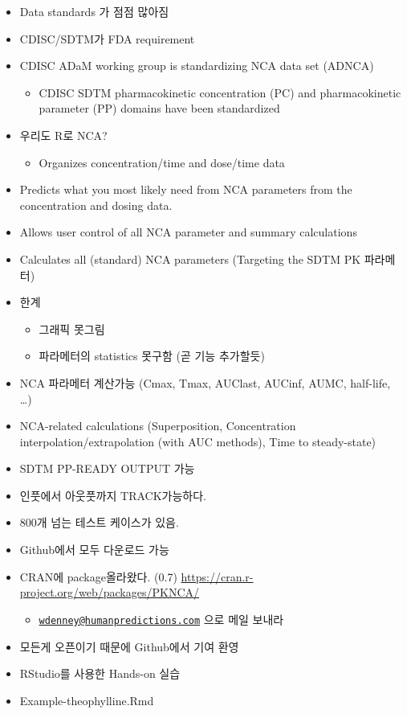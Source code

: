 \documentclass[12pt,]{krantz}
\providecommand{\tightlist}{%
  \setlength{\itemsep}{0pt}\setlength{\parskip}{0pt}}
\begin{document}
\begin{itemize}
\tightlist
\item
  Data standards 가 점점 많아짐
\item
  CDISC/SDTM가 FDA requirement
\item
  CDISC ADaM working group is standardizing NCA data set (ADNCA) \textbar{}

  \begin{itemize}
  \tightlist
  \item
    CDISC SDTM pharmacokinetic concentration (PC) and pharmacokinetic parameter (PP) domains have been standardized
  \end{itemize}
\item
  우리도 R로 NCA?

  \begin{itemize}
  \tightlist
  \item
    Organizes concentration/time and dose/time data
  \end{itemize}
\item
  Predicts what you most likely need from NCA parameters from the concentration and dosing data.
\item
  Allows user control of all NCA parameter and summary calculations
\item
  Calculates all (standard) NCA parameters (Targeting the SDTM PK 파라메터)
\item
  한계

  \begin{itemize}
  \tightlist
  \item
    그래픽 못그림
  \item
    파라메터의 statistics 못구함 (곧 기능 추가할듯)
  \end{itemize}
\item
  NCA 파라메터 계산가능 (Cmax, Tmax, AUClast, AUCinf, AUMC, half-life, \ldots)
\item
  NCA-related calculations (Superposition, Concentration interpolation/extrapolation (with AUC methods), Time to steady-state)
\item
  SDTM PP-READY OUTPUT 가능
\item
  인풋에서 아웃풋까지 TRACK가능하다.
\item
  800개 넘는 테스트 케이스가 있음.
\item
  Github에서 모두 다운로드 가능
\item
  CRAN에 package올라왔다. (0.7) \url{https://cran.r-project.org/web/packages/PKNCA/}

  \begin{itemize}
  \tightlist
  \item
    \href{mailto:wdenney@humanpredictions.com}{\nolinkurl{wdenney@humanpredictions.com}} 으로 메일 보내라
  \end{itemize}
\item
  모든게 오픈이기 때문에 Github에서 기여 환영
\item
  RStudio를 사용한 Hands-on 실습
\item
  Example-theophylline.Rmd


\end{itemize}
\end{document}
